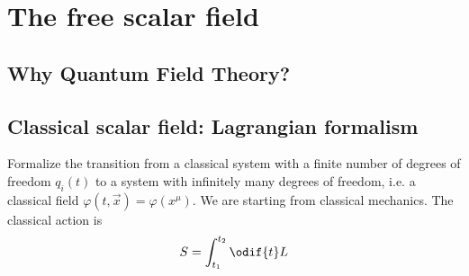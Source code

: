 \documentclass[../classnotes.tex]{subfiles}
\begin{document}
\chapter{The free scalar field}


\section{Why Quantum Field Theory?}

\section{Classical scalar field: Lagrangian formalism}

Formalize the transition from a classical system with a finite number of degrees of freedom \(q_i(t)\) to a system with infinitely many degrees of freedom, i.e. a classical field \(\varphi(t, \vec{x}) = \varphi(x^{\mu})\).
We are starting from classical mechanics.
The classical action is
\begin{equation}
    S = \int_{t_1}^{t_2} \odif{t} L
\end{equation}
\end{document}
